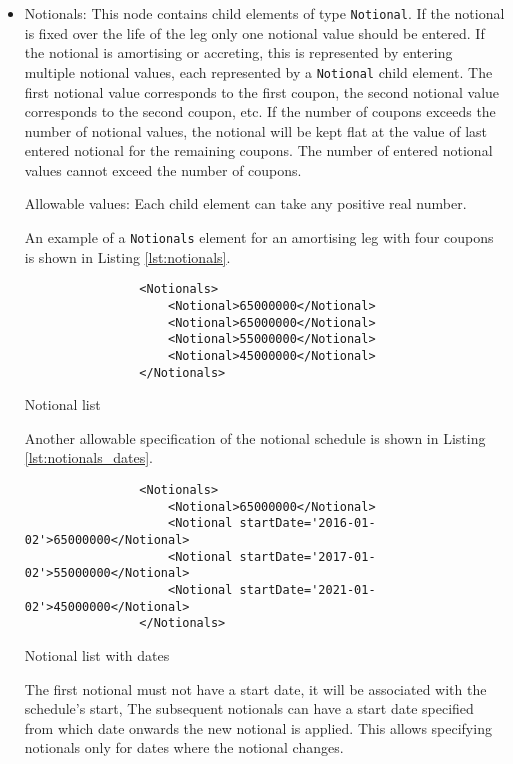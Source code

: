 \begin{itemize}
\item Notionals: This node contains child elements of type
  \lstinline!Notional!. If the notional is fixed over the life of the
  leg only one notional value should be entered. If the notional is
  amortising or accreting, this is represented by entering multiple
  notional values, each represented by a \lstinline!Notional! child
  element. The first notional value corresponds to the first coupon,
  the second notional value corresponds to the second coupon, etc. If
  the number of coupons exceeds the number of notional values, the
  notional will be kept flat at the value of last entered notional for
  the remaining coupons.  The number of entered notional values cannot
  exceed the number of coupons.

Allowable values: Each child element can take any positive real number.

\vspace{1em}

An example of a \lstinline!Notionals! element for an amortising leg with four coupons is shown in Listing \ref{lst:notionals}.
\begin{listing}[H]
\begin{verbatim}
                <Notionals>
                    <Notional>65000000</Notional>
                    <Notional>65000000</Notional>
                    <Notional>55000000</Notional>
                    <Notional>45000000</Notional>
                </Notionals>
\end{verbatim}
\caption{Notional list}
\label{lst:notionals}
\end{listing}

Another allowable specification of the notional schedule is shown in Listing \ref{lst:notionals_dates}. 
\begin{listing}[H]
\begin{verbatim}
                <Notionals>
                    <Notional>65000000</Notional>
                    <Notional startDate='2016-01-02'>65000000</Notional>
                    <Notional startDate='2017-01-02'>55000000</Notional>
                    <Notional startDate='2021-01-02'>45000000</Notional>
                </Notionals>
\end{verbatim}
\caption{Notional list with dates}
\label{lst:notionals_dates}
\end{listing}
The first notional must not have a start date, it will be associated
with the schedule's start, The subsequent notionals can have a start
date specified from which date onwards the new notional is applied. This allows
specifying notionals only for dates where the notional changes. 


\end{itemize}
